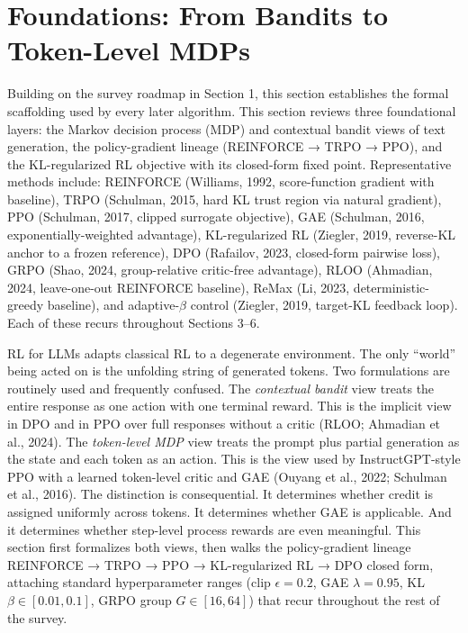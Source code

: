 \documentclass{article}
\begin{document}
\section{Foundations: From Bandits to Token-Level MDPs}\label{foundations-from-bandits-to-token-level-mdps}

Building on the survey roadmap in Section 1, this section establishes the formal scaffolding used by every later algorithm. This section reviews three foundational layers: the Markov decision process (MDP) and contextual bandit views of text generation, the policy-gradient lineage (REINFORCE → TRPO → PPO), and the KL-regularized RL objective with its closed-form fixed point. Representative methods include: REINFORCE (Williams, 1992, score-function gradient with baseline), TRPO (Schulman, 2015, hard KL trust region via natural gradient), PPO (Schulman, 2017, clipped surrogate objective), GAE (Schulman, 2016, exponentially-weighted advantage), KL-regularized RL (Ziegler, 2019, reverse-KL anchor to a frozen reference), DPO (Rafailov, 2023, closed-form pairwise loss), GRPO (Shao, 2024, group-relative critic-free advantage), RLOO (Ahmadian, 2024, leave-one-out REINFORCE baseline), ReMax (Li, 2023, deterministic-greedy baseline), and adaptive-\(\beta\) control (Ziegler, 2019, target-KL feedback loop). Each of these recurs throughout Sections 3--6.

RL for LLMs adapts classical RL to a degenerate environment. The only ``world'' being acted on is the unfolding string of generated tokens. Two formulations are routinely used and frequently confused. The \emph{contextual bandit} view treats the entire response as one action with one terminal reward. This is the implicit view in DPO \citep{rafailov2023directpreferenceop} and in PPO over full responses without a critic (RLOO; Ahmadian et al., 2024). The \emph{token-level MDP} view treats the prompt plus partial generation as the state and each token as an action. This is the view used by InstructGPT-style PPO with a learned token-level critic and GAE (Ouyang et al., 2022; Schulman et al., 2016). The distinction is consequential. It determines whether credit is assigned uniformly across tokens. It determines whether GAE is applicable. And it determines whether step-level process rewards \citep{lightman2023letsverifystepbyst} are even meaningful. This section first formalizes both views, then walks the policy-gradient lineage REINFORCE → TRPO → PPO → KL-regularized RL → DPO closed form, attaching standard hyperparameter ranges (clip \(\epsilon = 0.2\), GAE \(\lambda = 0.95\), KL \(\beta \in [0.01, 0.1]\), GRPO group \(G \in [16, 64]\)) that recur throughout the rest of the survey.
\end{document}
